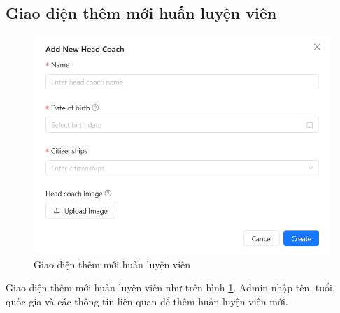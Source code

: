 \documentclass[../BTL.tex]{subfiles}
\begin{document}
\subsection{Giao diện thêm mới huấn luyện viên}
\begin{figure}
    \centering
    \includegraphics[width=1\linewidth]{Hinhve/admin_add_coach.png}
    \caption{Giao diện thêm mới huấn luyện viên}
    \label{fig:admin_add_coach}
\end{figure}
Giao diện thêm mới huấn luyện viên như trên hình \ref{fig:admin_add_coach}. Admin nhập tên, tuổi, quốc gia và các thông tin liên quan để thêm huấn luyện viên mới.
\end{document}

